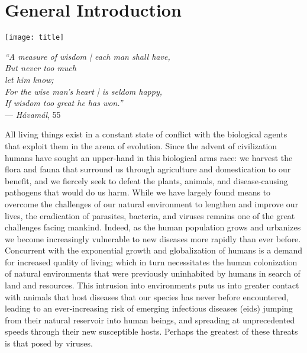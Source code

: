 \chapter{General Introduction}\label{ch:introduction}

\begin{minipage}[b]{0.6\textwidth}
  \texttt{[image: title]} %
\end{minipage}
\hfill
\begin{minipage}[b]{0.35\textwidth}
  \begin{flushright}
    \footnotesize
    \textit{``A measure of wisdom | each man shall have,\\
    But never too much\\let him know;\\
    For the wise man's heart | is seldom happy,\\
    If wisdom too great he has won.''} \\
    --- \textit{H\'avam\'al}, 55 
  \end{flushright}
  \vspace{2cm}
\end{minipage}

\clearpage

\onehalfspacing

All living things exist in a constant state of conflict with the biological agents that exploit them in the arena of evolution.
Since the advent of civilization humans have sought an upper-hand in this biological arms race: we harvest the flora and fauna that surround us through agriculture and domestication to our benefit, and we fiercely seek to defeat the plants, animals, and disease-causing pathogens that would do us harm.
While we have largely found means to overcome the challenges of our natural environment to lengthen and improve our lives, the eradication of parasites, bacteria, and viruses remains one of the great challenges facing mankind.
Indeed, as the human population grows and urbanizes we become increasingly vulnerable to new diseases more rapidly than ever before.
Concurrent with the exponential growth and globalization of humans is a demand for increased quality of living; which in turn necessitates the human colonization of natural environments that were previously uninhabited by humans in search of land and resources.
This intrusion into environments puts us into greater contact with animals that host diseases that our species has never before encountered, leading to an ever-increasing risk of emerging infectious diseases (\gls{eid}s) jumping from their natural reservoir into human beings, and spreading at unprecedented speeds through their new susceptible hosts.
Perhaps the greatest of these threats is that posed by viruses.

